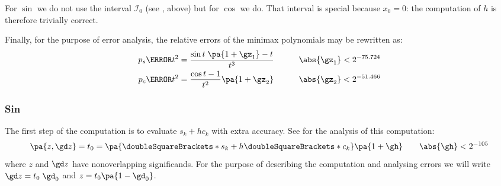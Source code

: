 \documentclass[10pt, a4paper, twoside]{basestyle}
\newcommand{\round}[1]{\doubleSquareBrackets*{#1}}
\begin{document}
For $\sin$ we do not use the interval $\mathscr{I}_0$ (see , above) but for $\cos$ we do.  That interval is special because $x_0 = 0$: the computation of $h$ is therefore trivially correct.

Finally, for the purpose of error analysis, the relative errors of the minimax polynomials may be rewritten as:
\begin{align*}
p_s\of{t^2} &= \frac{\sin t \; \pa{1 + \gz_1} - t}{t^3} \qquad & \abs{\gz_1} < 2^{-75.724} \\
p_c\of{t^2} &= \frac{\cos t - 1}{t^2} \pa{1 + \gz_2} \qquad & \abs{\gz_2} < 2^{-51.466}
\end{align*}

\subsubsection*{Sin}\label{secerroranalysissin}

The first step of the computation is to evaluate $s_k + h c_k$ with extra accuracy.  See  for the analysis of this computation:
\[
\pa{z, \gd z} = t_0 = \pa{\round{s_k} + h \round{c_k}} \pa{1 + \gh} \qquad \abs{\gh} < 2^{-105}
\]
where $z$ and $\gd z$ have nonoverlapping significands.  For the purpose of describing the computation and analysing errors we will write $\gd z = t_0 \; \gd_0$ and $z = t_0 \pa{1 - \gd_0}$.
\end{document}
